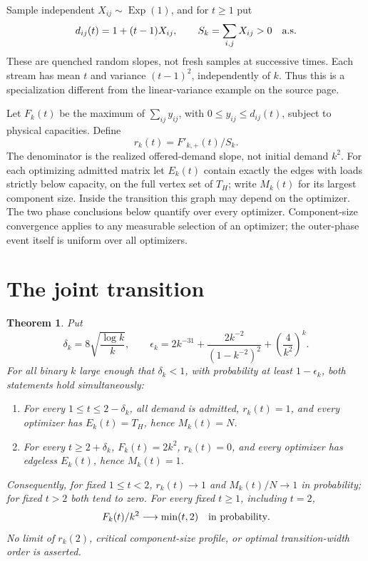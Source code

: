 \documentclass[10pt]{article}
\newtheorem{theorem}{Theorem}
\begin{document}
Sample independent \(X_{ij}\sim\operatorname{Exp}(1)\), and for \(t\ge1\) put
\[
 d_{ij}(t)=1+(t-1)X_{ij},\qquad S_k=\sum_{i,j}X_{ij}>0\quad\hbox{a.s.}
\]
These are quenched random slopes, not fresh samples at successive times.
Each stream has mean \(t\) and variance \((t-1)^2\), independently of \(k\).
Thus this is a specialization different from the linear-variance example
on the source page.

Let \(F_k(t)\) be the maximum of \(\sum_{ij}y_{ij}\), with
\(0\le y_{ij}\le d_{ij}(t)\), subject to physical capacities. Define
\[
 r_k(t)=F'_{k,+}(t)/S_k.
\]
The denominator is the realized offered-demand slope, not initial demand
\(k^2\). For each optimizing admitted matrix let \(E_k(t)\) contain exactly
the edges with loads strictly below capacity, on the full vertex set of
\(T_H\); write \(M_k(t)\) for its largest component size.
Inside the transition this graph may depend on the optimizer. The two
phase conclusions below quantify over every optimizer. Component-size
convergence applies to any measurable selection of an optimizer;
the outer-phase event itself is uniform over all optimizers.

\section{The joint transition}
\begin{theorem}\label{main}
Put
\[
 \delta_k=8\sqrt{\frac{\log k}{k}},\qquad
 \epsilon_k=2k^{-31}+\frac{2k^{-2}}{(1-k^{-2})^2}
                   +\left(\frac4{k^2}\right)^k.
\]
For all binary \(k\) large enough that \(\delta_k<1\), with probability at
least \(1-\epsilon_k\), both statements hold simultaneously:
\begin{enumerate}[label=(\roman*),leftmargin=2em]
\item For every \(1\le t\le2-\delta_k\), all demand is admitted,
\(r_k(t)=1\), and every optimizer has \(E_k(t)=T_H\), hence \(M_k(t)=N\).
\item For every \(t\ge2+\delta_k\), \(F_k(t)=2k^2\), \(r_k(t)=0\),
and every optimizer has edgeless \(E_k(t)\), hence \(M_k(t)=1\).
\end{enumerate}
Consequently, for fixed \(1\le t<2\), \(r_k(t)\to1\) and \(M_k(t)/N\to1\)
in probability; for fixed \(t>2\) both tend to zero.
For every fixed \(t\ge1\), including \(t=2\),
\[
 F_k(t)/k^2\longrightarrow\min(t,2)\quad\hbox{in probability}.
\]
No limit of \(r_k(2)\), critical component-size profile, or optimal
transition-width order is asserted.
\end{theorem}
\end{document}
